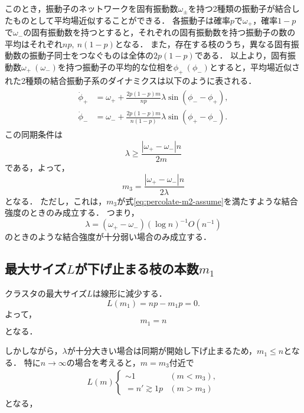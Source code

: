 \documentclass[../main]{subfiles}
\begin{document}
このとき，振動子のネットワークを固有振動数$\omega_\pm$を持つ2種類の振動子が結合したものとして平均場近似することができる．
各振動子は確率$p$で$\omega_+$，確率$1-p$で$\omega_-$の固有振動数を持つとすると，それぞれの固有振動数を持つ振動子の数の平均はそれぞれ$np,\ n(1-p)$となる．
また，存在する枝のうち，異なる固有振動数の振動子同士をつなぐものは全体の$2p(1-p)$である．
以上より，固有振動数$\omega_+\ (\omega_-)$を持つ振動子の平均的な位相を$\phi_+\ (\phi_-)$とすると，平均場近似された2種類の結合振動子系のダイナミクスは以下のように表される．
\begin{align}
    \begin{split}
        \dot{\phi}_+&=\omega_++\frac{2p(1-p)m}{np}\lambda\sin(\phi_--\phi_+),\\
        \dot{\phi}_-&=\omega_-+\frac{2p(1-p)m}{n(1-p)}\lambda\sin(\phi_+-\phi_-).
    \end{split}
\end{align}
この同期条件は
\begin{equation*}
    \lambda\geq \frac{|\omega_+-\omega_-|n}{2m}
\end{equation*}
である，よって，
\begin{equation}
    \label{eq:percolate-m3}
    m_3=\frac{|\omega_+-\omega_-|n}{2\lambda}
\end{equation}
となる．
ただし，これは，$m_3$が式\eqref{eq:percolate-m2-assume}を満たすような結合強度のときのみ成立する．
つまり，
\begin{equation}
    \label{eq:er-meanfield-k}
    \lambda=(\omega_+-\omega_-)(\log n)^{-1}O(n^{-1})
\end{equation}
のときのような結合強度が十分弱い場合のみ成立する．
\subsection{最大サイズ$L$が下げ止まる枝の本数$m_1$}
\label{sec:percolate-m1}
クラスタの最大サイズ$L$は線形に減少する．
\begin{equation}
    L(m_1)=np-m_1p=0.
\end{equation}
よって，
\begin{equation}
    m_1=n
\end{equation}
となる．

しかしながら，$\lambda$が十分大きい場合は同期が開始し下げ止まるため，$m_1\leq n$となる．
特に$n\to\infty$の場合を考えると，$m=m_3$付近で
\begin{align}
    L(m)
    \begin{cases}
        \sim 1&(m<m_3),\\        
        =n'\gtrsim  1p&(m> m_3)        
    \end{cases}
\end{align}
となる，
\end{document}

